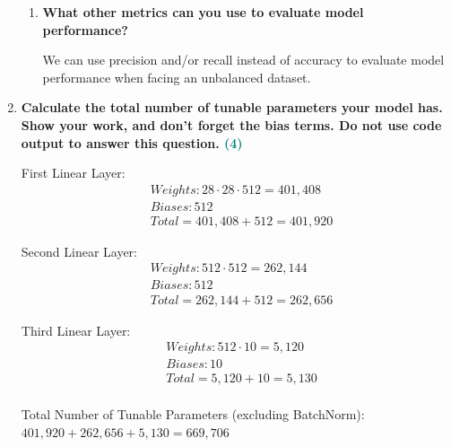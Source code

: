 \documentclass[a4paper]{article}
\begin{document}
\begin{sloppypar}
\begin{enumerate}[start=4,label=Q\arabic*,left=0pt]
\begin{enumerate}
        \item \textbf{What other metrics can you use to evaluate model performance?}
        
        \par We can use precision and/or recall instead of accuracy to evaluate model performance when 
        facing an unbalanced dataset.

    \end{enumerate}

    \par 

    \item \textbf{Calculate the total number of tunable parameters your model has. Show your work,
    and don’t forget the bias terms. Do not use code output to answer this question. \hfill \textcolor{teal}{(4)}}

    First Linear Layer:
    \begin{align*}
        & Weights: 28 \cdot 28 \cdot 512 = 401,408 \\
        & Biases: 512 \\
        & Total = 401,408 + 512 = 401,920
    \end{align*}
    
    Second Linear Layer:
    \begin{align*}
        & Weights: 512 \cdot 512 = 262,144 \\
        & Biases: 512 \\
        & Total = 262,144 + 512 = 262,656
    \end{align*}

    Third Linear Layer:
    \begin{align*}
        & Weights: 512 \cdot 10 = 5,120 \\
        & Biases: 10 \\
        & Total = 5,120 + 10 = 5,130 \\
    \end{align*}

    Total Number of Tunable Parameters (excluding BatchNorm): $401,920 + 262,656 + 5,130 = 669,706$

\end{enumerate}
\end{sloppypar}



\end{document}
